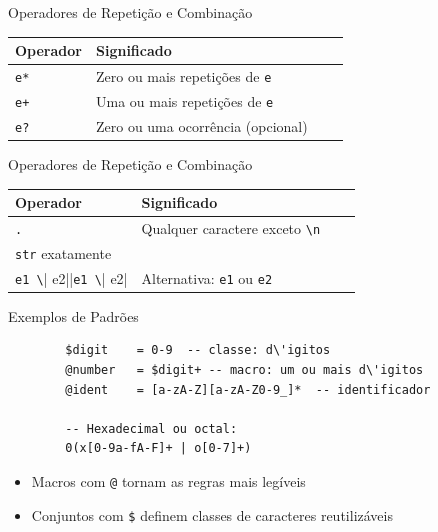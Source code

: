\begin{frame}[fragile]{Operadores de Repetição e Combinação}

    \begin{table}
        \begin{tabular}{l l l l}
            \hline
            Operador & Significado \\
            \hline
            \texttt{e*} & Zero ou mais repetições de
            \texttt{e} \\
            \texttt{e+} & Uma ou mais repetições de
            \texttt{e} \\
            \texttt{e?} & Zero ou uma ocorrência (opcional) \\
            \hline
        \end{tabular}
    \end{table}
\end{frame}

\begin{frame}[fragile]{Operadores de Repetição e Combinação}

    \begin{table}
        \begin{tabular}{l l l l}
            \hline
            Operador & Significado \\
            \hline
            \verb|.| & Qualquer caractere exceto
            \verb|\n| \\
            \texttt{str} exatamente \\
            \verb|e1 \| e2||\verb|e1 \| e2| & Alternativa:
            \texttt{e1} ou \texttt{e2} \\
            \hline
        \end{tabular}
    \end{table}
\end{frame}

\begin{frame}[fragile]{Exemplos de Padrões}

    \begin{lstlisting}
        $digit    = 0-9  -- classe: d\'igitos
        @number   = $digit+ -- macro: um ou mais d\'igitos
        @ident    = [a-zA-Z][a-zA-Z0-9_]*  -- identificador

        -- Hexadecimal ou octal:
        0(x[0-9a-fA-F]+ | o[0-7]+)
    \end{lstlisting}

    \begin{itemize}

        \item
        Macros com \texttt{@} tornam as regras mais legíveis
        \item
        Conjuntos com \verb|$| definem classes de
        caracteres reutilizáveis
    \end{itemize}
\end{frame}


